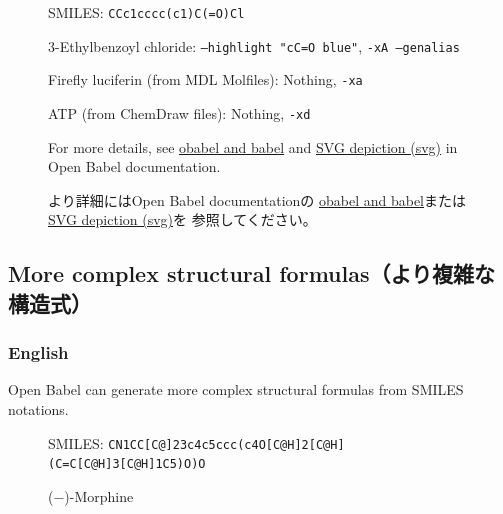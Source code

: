 \documentclass[dvipdfmx,12pt]{jsarticle}
\begin{document}
\begin{figure}[ht]
  \centering
  \caption{3-Ethylbenzoyl chloride: \texttt{--highlight "cC=O blue"}, \texttt{-xA --genalias}}
  SMILES: \verb|CCc1cccc(c1)C(=O)Cl|
\end{figure}

\begin{figure}[ht]
  \centering
  \caption{Firefly luciferin (from MDL Molfiles): Nothing, \texttt{-xa}}
\end{figure}

\begin{figure}[ht]
  \centering
  \caption{ATP (from ChemDraw files): Nothing, \texttt{-xd}}
\end{figure}

\begin{figure}[ht]
For more details, see
\href{http://openbabel.org/docs/dev/Command-line_tools/babel.html}{obabel and babel}
and
\href{http://openbabel.org/docs/dev/FileFormats/SVG_2D_depiction.html}{SVG depiction (svg)}
in Open Babel documentation.

より詳細にはOpen Babel documentationの
\href{http://openbabel.org/docs/dev/Command-line_tools/babel.html}{obabel and babel}または
\href{http://openbabel.org/docs/dev/FileFormats/SVG_2D_depiction.html}{SVG depiction (svg)}を
参照してください。
\end{figure}

\clearpage

\subsection{More complex structural formulas（より複雑な構造式）}

\subsubsection{English}

Open Babel can generate more complex structural formulas from SMILES notations.

\begin{figure}[ht]
  \centering
  \caption{($-$)-Morphine}
  SMILES: \verb|CN1CC[C@]23c4c5ccc(c4O[C@H]2[C@H](C=C[C@H]3[C@H]1C5)O)O|
\end{figure}
\end{document}
